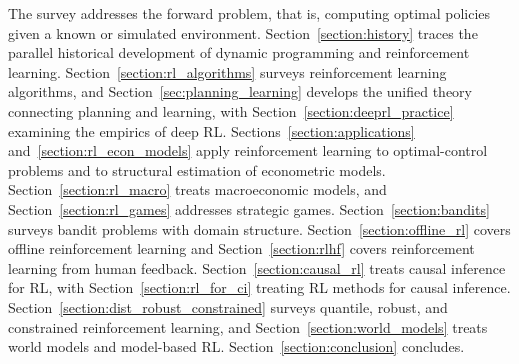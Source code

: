 The survey addresses the forward problem, that is, computing optimal policies given a known or simulated environment. Section~\ref{section:history} traces the parallel historical development of dynamic programming and reinforcement learning. Section~\ref{section:rl_algorithms} surveys reinforcement learning algorithms, and Section~\ref{sec:planning_learning} develops the unified theory connecting planning and learning, with Section~\ref{section:deeprl_practice} examining the empirics of deep RL. Sections~\ref{section:applications} and~\ref{section:rl_econ_models} apply reinforcement learning to optimal-control problems and to structural estimation of econometric models. Section~\ref{section:rl_macro} treats macroeconomic models, and Section~\ref{section:rl_games} addresses strategic games. Section~\ref{section:bandits} surveys bandit problems with domain structure. Section~\ref{section:offline_rl} covers offline reinforcement learning and Section~\ref{section:rlhf} covers reinforcement learning from human feedback. Section~\ref{section:causal_rl} treats causal inference for RL, with Section~\ref{section:rl_for_ci} treating RL methods for causal inference. Section~\ref{section:dist_robust_constrained} surveys quantile, robust, and constrained reinforcement learning, and Section~\ref{section:world_models} treats world models and model-based RL. Section~\ref{section:conclusion} concludes.
